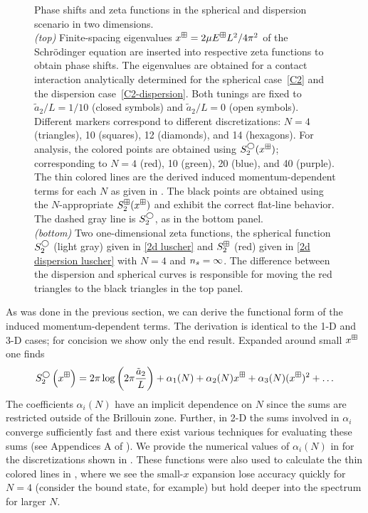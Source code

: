\begin{figure}
    \center
    \scalebox{0.8}{}
    \caption{
    	Phase shifts and zeta functions in the spherical and dispersion scenario in two dimensions.
		\\
		\textit{(top)}
        	Finite-spacing eigenvalues $x^\boxplus=2\mu E^\boxplus L^2/4\pi^2$ of the Schr\"odinger equation are inserted into respective zeta functions to obtain phase shifts.
			The eigenvalues are obtained for a contact interaction analytically determined for the spherical case~\eqref{C2} and the dispersion case~\eqref{C2-dispersion}.
			Both tunings are fixed to $\tilde a_{2}/L=1/10$ (closed symbols) and $\tilde a_{2}/L=0$ (open symbols).
			Different markers correspond to different discretizations: $N=4$ (triangles), 10 (squares), 12 (diamonds), and 14 (hexagons).
        	For analysis, the colored points are obtained using $S^\bigcirc_2(x^\boxplus)$; corresponding to $N=4$ (red), 10 (green), 20 (blue), and 40 (purple).
        	The thin colored lines are the derived induced momentum-dependent terms for each $N$ as given in .
        	The black points are obtained using the $N$-appropriate $S^{\boxplus}_2(x^\boxplus)$ and exhibit the correct flat-line behavior.
        	The dashed gray line is $S_2^\bigcirc$, as in the bottom panel.
        \\
        \textit{(bottom)}
        	Two one-dimensional zeta functions, the spherical function $S_2^{\bigcirc}$ (light gray) given in \eqref{2d luscher} and $S_2^{\boxplus}$ (red) given in \eqref{2d dispersion luscher} with $N=4$ and ${n_s}=\infty$.
        	The difference between the dispersion and spherical curves is responsible for moving the red triangles to the black triangles in the top panel.
	}
    \label{fig:luescher2d}
\end{figure}

As was done in the previous section, we can derive the functional form of the induced momentum-dependent terms.
The derivation is identical to the 1-D and 3-D cases; for concision we show only the end result.
Expanded around small $x^\boxplus$ one finds
\begin{equation}
    \label{eq:2D corrections}
    S^\bigcirc_{2}\left(x^\boxplus\right)
    =
    2\pi\log\left(2\pi \frac{\tilde a_{2}}{L}\right)
    + \alpha_1(N)
    + \alpha_2(N) x^\boxplus
    + \alpha_3(N) (x^\boxplus)^2
    + \ldots
\end{equation}
The coefficients $\alpha_i(N)$ have an implicit dependence on $N$ since the sums are restricted outside of the Brillouin zone.  Further, in 2-D the sums involved in $\alpha_i$ converge sufficiently fast and there exist various techniques for evaluating these sums (see Appendices A of ).
We provide the numerical values of $\alpha_i(N)$ in  for the discretizations shown in .
These functions were also used to calculate the thin colored lines in , where we see the small-$x$ expansion lose accuracy quickly for $N=4$ (consider the bound state, for example) but hold deeper into the spectrum for larger $N$.

